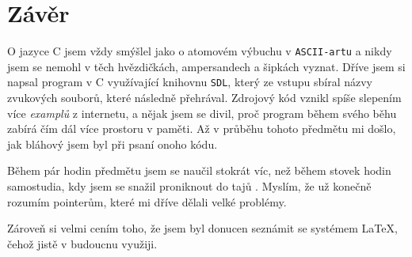 \documentclass[12pt,a4paper]{article}
\begin{document}
\section{Závěr}
%
O jazyce C jsem vždy smýšlel jako o atomovém výbuchu v \texttt{ASCII-artu} a 
nikdy jsem se nemohl v těch hvězdičkách, ampersandech a šipkách vyznat. Dříve jsem 
si napsal program v C využívající knihovnu \texttt{SDL}, který ze vstupu sbíral názvy zvukových
souborů, které následně přehrával. Zdrojový kód vznikl spíše slepením více \textit{examplů} z internetu, a nějak jsem se divil,
proč program během svého běhu zabírá čím dál více prostoru v paměti. Až v průběhu tohoto 
předmětu mi došlo, jak bláhový jsem byl při psaní onoho kódu. 

Během pár hodin předmětu jsem se naučil stokrát víc, než během stovek hodin 
samostudia, kdy jsem se snažil proniknout do tajů . 
Myslím, že už konečně rozumím pointerům, které mi dříve dělali velké problémy.

Zároveň si velmi cením toho, že jsem byl donucen seznámit se systémem \LaTeX, 
čehož jistě v budoucnu využiji.
%
%
\end{document}
